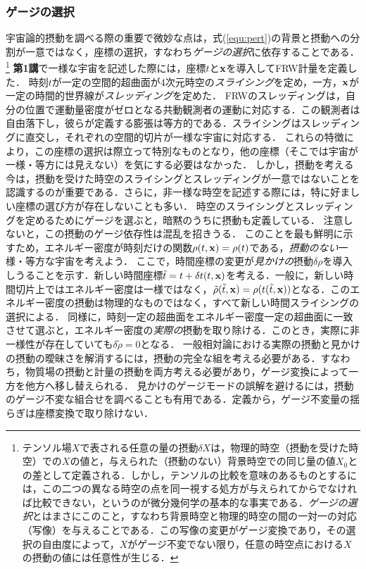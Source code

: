 \subsubsection{ゲージの選択}
宇宙論的摂動を調べる際の重要で微妙な点は，式(\ref{equ:pert})の背景と摂動への分割が一意ではなく，座標の選択，すなわち{\it ゲージの選択}に依存することである．\footnote{テンソル場$X$で表される任意の量の摂動$\delta X$は，物理的時空（摂動を受けた時空）での$X$の値と，与えられた（摂動のない）背景時空での同じ量の値$X_0$との差として定義される．しかし，テンソルの比較を意味のあるものとするには，この二つの異なる時空の点を同一視する処方が与えられてからでなければ比較できない，というのが微分幾何学の基本的な事実である．{\it ゲージの選択}とはまさにこのこと，すなわち背景時空と物理的時空の間の一対一の対応（写像）を与えることである．この写像の変更がゲージ変換であり，その選択の自由度によって，$X$がゲージ不変でない限り，任意の時空点における$X$の摂動の値には任意性が生じる．}
{\bf 第1講}で一様な宇宙を記述した際には，座標$t$と${\bf x}$を導入してFRW計量を定義した．
時刻$t$が一定の空間的超曲面が4次元時空の{\it スライシング}を定め，一方，${\bf x}$が一定の時間的世界線が{\it スレッディング}を定めた．
FRWのスレッディングは，自分の位置で運動量密度がゼロとなる共動観測者の運動に対応する．この観測者は自由落下し，彼らが定義する膨張は等方的である．スライシングはスレッディングに直交し，それぞれの空間的切片が一様な宇宙に対応する．
これらの特徴により，この座標の選択は際立って特別なものとなり，他の座標（そこでは宇宙が一様・等方には見えない）を気にする必要はなかった．
しかし，摂動を考える今は，摂動を受けた時空のスライシングとスレッディングが一意ではないことを認識するのが重要である．さらに，非一様な時空を記述する際には，特に好ましい座標の選び方が存在しないことも多い．
時空のスライシングとスレッディングを定めるためにゲージを選ぶと，暗黙のうちに摂動も定義している．
注意しないと，この摂動のゲージ依存性は混乱を招きうる．
このことを最も鮮明に示すため，エネルギー密度が時刻だけの関数$\rho(t, {\bf x})= \rho(t)$である，{\it 摂動のない}一様・等方な宇宙を考えよう．
ここで，時間座標の変更が{\it 見かけの}摂動$\delta \rho$を導入しうることを示す．新しい時間座標$\tilde t = t + \delta t(t, {\bf x})$を考える．一般に，新しい時間切片上ではエネルギー密度は一様ではなく，$\tilde \rho(\tilde t, {\bf x})= \rho(t(\tilde t, {\bf x}))$となる．このエネルギー密度の摂動は物理的なものではなく，すべて新しい時間スライシングの選択による．
同様に，時刻一定の超曲面をエネルギー密度一定の超曲面に一致させて選ぶと，エネルギー密度の{\it 実際の}摂動を取り除ける．このとき，実際に非一様性が存在していても$\delta \tilde \rho=0$となる．
一般相対論における実際の摂動と見かけの摂動の曖昧さを解消するには，摂動の完全な組を考える必要がある．すなわち，物質場の摂動と計量の摂動を両方考える必要があり，ゲージ変換によって一方を他方へ移し替えられる．
見かけのゲージモードの誤解を避けるには，摂動のゲージ不変な組合せを調べることも有用である．定義から，ゲージ不変量の揺らぎは座標変換で取り除けない．


